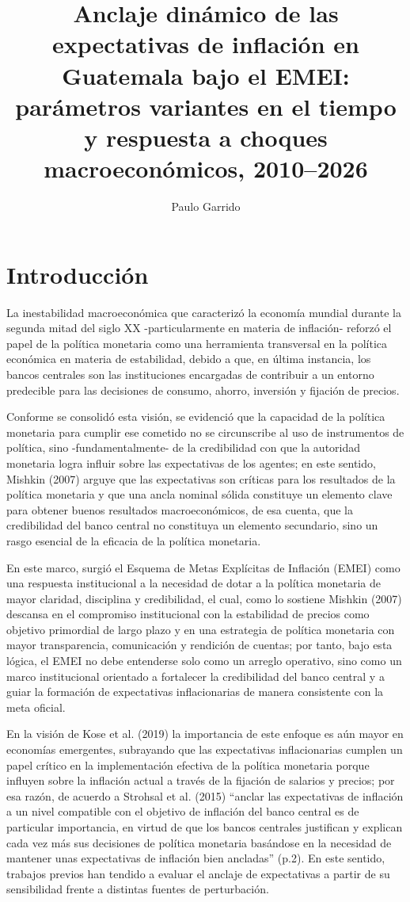 \documentclass[
  10.5pt,
  letterpaper,
  twocolumn]{article}
\title{Anclaje dinámico de las expectativas de inflación en Guatemala
bajo el EMEI: parámetros variantes en el tiempo y respuesta a choques
macroeconómicos, 2010--2026}
\author{Paulo Garrido}
\date{}
\begin{document}
\maketitle


\section{Introducción}\label{introducciuxf3n}

La inestabilidad macroeconómica que caracterizó la economía mundial
durante la segunda mitad del siglo XX -particularmente en materia de
inflación- reforzó el papel de la política monetaria como una
herramienta transversal en la política económica en materia de
estabilidad, debido a que, en última instancia, los bancos centrales son
las instituciones encargadas de contribuir a un entorno predecible para
las decisiones de consumo, ahorro, inversión y fijación de precios.

Conforme se consolidó esta visión, se evidenció que la capacidad de la
política monetaria para cumplir ese cometido no se circunscribe al uso
de instrumentos de política, sino -fundamentalmente- de la credibilidad
con que la autoridad monetaria logra influir sobre las expectativas de
los agentes; en este sentido, Mishkin (2007) arguye que las expectativas
son críticas para los resultados de la política monetaria y que una
ancla nominal sólida constituye un elemento clave para obtener buenos
resultados macroeconómicos, de esa cuenta, que la credibilidad del banco
central no constituya un elemento secundario, sino un rasgo esencial de
la eficacia de la política monetaria.

En este marco, surgió el Esquema de Metas Explícitas de Inflación (EMEI)
como una respuesta institucional a la necesidad de dotar a la política
monetaria de mayor claridad, disciplina y credibilidad, el cual, como lo
sostiene Mishkin (2007) descansa en el compromiso institucional con la
estabilidad de precios como objetivo primordial de largo plazo y en una
estrategia de política monetaria con mayor transparencia, comunicación y
rendición de cuentas; por tanto, bajo esta lógica, el EMEI no debe
entenderse solo como un arreglo operativo, sino como un marco
institucional orientado a fortalecer la credibilidad del banco central y
a guiar la formación de expectativas inflacionarias de manera
consistente con la meta oficial.

En la visión de Kose et al. (2019) la importancia de este enfoque es aún
mayor en economías emergentes, subrayando que las expectativas
inflacionarias cumplen un papel crítico en la implementación efectiva de
la política monetaria porque influyen sobre la inflación actual a través
de la fijación de salarios y precios; por esa razón, de acuerdo a
Strohsal et al. (2015) ``anclar las expectativas de inflación a un nivel
compatible con el objetivo de inflación del banco central es de
particular importancia, en virtud de que los bancos centrales justifican
y explican cada vez más sus decisiones de política monetaria basándose
en la necesidad de mantener unas expectativas de inflación bien
ancladas'' (p.2). En este sentido, trabajos previos han tendido a
evaluar el anclaje de expectativas a partir de su sensibilidad frente a
distintas fuentes de perturbación.
\end{document}
